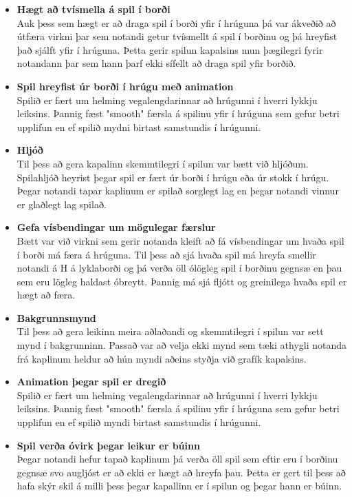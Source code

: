 \documentclass[11pt,a4paper,titlepage]{article}
\theoremstyle{plain}
\theoremstyle{remark}
\begin{document}
\begin{itemize}
\item {\bf Hægt að tvísmella á spil í borði} \\
Auk þess sem hægt er að draga spil í borði yfir í hrúguna þá var ákveðið að útfæra virkni þar sem notandi getur tvísmellt á spil í borðinu og þá hreyfist það sjálft yfir í hrúguna. Þetta gerir spilun kapalsins mun þægilegri fyrir notandann þar sem hann þarf ekki sífellt að draga spil yfir borðið. 

\item {\bf Spil hreyfist úr borði í hrúgu með animation} \\ 
Spilið er fært um helming vegalengdarinnar að hrúgunni í hverri lykkju leiksins. Þannig fæst "smooth" færsla á spilinu yfir í hrúguna sem gefur betri upplifun en ef spilið mydni birtast samstundis í hrúgunni. 

\item {\bf Hljóð} \\
Til þess að gera kapalinn skemmtilegri í spilun var bætt við hljóðum. Spilahljóð heyrist þegar spil er fært úr borði í hrúgu eða úr stokk í hrúgu. Þegar notandi tapar kaplinum er spilað sorglegt lag en þegar notandi vinnur er glaðlegt lag spilað. 

\item {\bf Gefa vísbendingar um mögulegar færslur} \\
Bætt var við virkni sem gerir notanda kleift að fá vísbendingar um hvaða spil í borði má færa á hrúguna. Til þess að sjá hvaða spil má hreyfa smellir notandi á H á lyklaborði og þá verða öll ólögleg spil í borðinu gegnsæ en þau sem eru lögleg haldast óbreytt. Þannig má sjá fljótt og greinilega hvaða spil er hægt að færa. 

\item {\bf Bakgrunnsmynd} \\
Til þess að gera leikinn meira aðlaðandi og skemmtilegri í spilun var sett mynd í bakgrunninn. Passað var að velja ekki mynd sem tæki athygli notanda frá kaplinum heldur að hún myndi aðeins styðja við grafík kapalsins. 

\item {\bf Animation þegar spil er dregið} \\
Spilið er fært um helming vegalengdarinnar að hrúgunni í hverri lykkju leiksins. Þannig fæst "smooth" færsla á spilinu yfir í hrúguna sem gefur betri upplifun en ef spilið myndi birtast samstundis í hrúgunni. 

\item {\bf Spil verða óvirk þegar leikur er búinn} \\
Þegar notandi hefur tapað kaplinum þá verða öll spil sem eftir eru í borðinu gegnsæ svo augljóst er að ekki er hægt að hreyfa þau. Þetta er gert til þess að hafa skýr skil á milli þess þegar kapallinn er í spilun og þegar hann er búinn.


\end{itemize}
\end{document}
